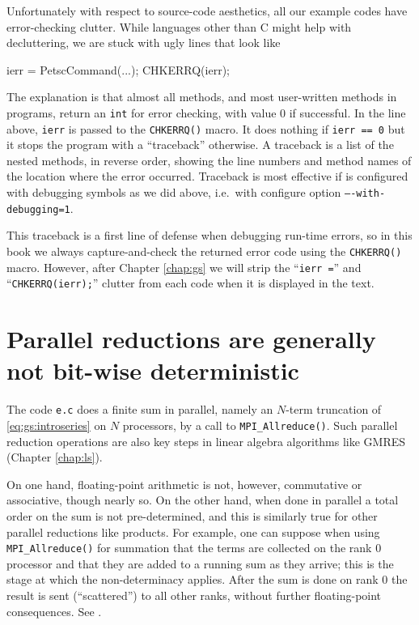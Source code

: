 Unfortunately with respect to source-code aesthetics, all our \PETSc example codes have error-checking clutter.  While languages other than C might help with decluttering, we are stuck with ugly lines that look like
\begin{code}
ierr = PetscCommand(...); CHKERRQ(ierr);
\end{code}
The explanation is that almost all \PETSc methods, and most user-written methods in \PETSc programs, return an \texttt{int} for error checking, with value $0$ if successful.  In the line above, \texttt{ierr} is passed to the \texttt{CHKERRQ()} macro.  It does nothing if \texttt{ierr == 0} but it stops the program with a ``traceback'' otherwise.  A traceback is a list of the nested methods, in reverse order, showing the line numbers and method names of the location where the error occurred.  Traceback is most effective if \PETSc is configured with debugging symbols as we did above, i.e.~with configure option \texttt{----with-debugging=1}.

This traceback is a first line of defense when debugging run-time errors, so in this book we always capture-and-check the returned error code using the \texttt{CHKERRQ()} macro.  However, after Chapter \ref{chap:gs} we will strip the ``\texttt{ierr =}'' and ``\texttt{CHKERRQ(ierr);}'' clutter from each code when it is displayed in the text.


\section{Parallel reductions are generally not bit-wise deterministic}

The code \texttt{e.c} does a finite sum in parallel, namely an $N$-term truncation of \eqref{eq:gs:introseries} on  $N$ processors, by a call to \texttt{MPI\_Allreduce()}.  Such parallel reduction operations are also key steps in linear algebra algorithms like GMRES (Chapter \ref{chap:ls}).

On one hand, floating-point arithmetic is not, however, commutative or associative, though nearly so.  On the other hand, when done in parallel a total order on the sum is not pre-determined, and this is similarly true for other parallel reductions like products.  For example, one can suppose when using \texttt{MPI\_Allreduce()} for summation that the terms are collected on the rank $0$ processor and that they are added to a running sum as they arrive; this is the stage at which the non-determinacy applies.  After the sum is done on rank $0$ the result is sent (``scattered'') to all other ranks, without further floating-point consequences.  See \citep{Groppetal1999}.

